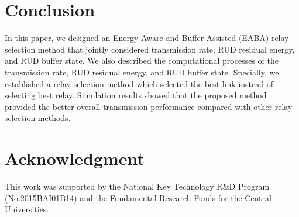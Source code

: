 \documentclass[conference]{IEEEtran}
\begin{document}
\section{Conclusion}
In this paper, we designed an Energy-Aware and Buffer-Assisted (EABA) relay selection method that jointly considered transmission rate, RUD residual energy, and RUD buffer state. We also described the computational processes of the transmission rate, RUD residual energy, and RUD buffer state. Specially, we established a relay selection method which selected the best link instead of selecting best relay. Simulation results showed that the proposed method provided the better overall transmission performance compared with other relay selection methods.

\section*{Acknowledgment}
This work was supported by the National Key Technology R\&D Program (No.2015BAI01B14) and the Fundamental Research Funds for the Central Universities.


\end{document}

